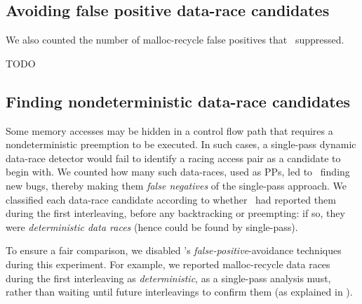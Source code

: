 %


\subsection{Avoiding false positive data-race candidates}
\label{sec:eval-falsepos}

We also counted the number of malloc-recycle false positives that \landslide~suppressed.

TODO


\subsection{Finding nondeterministic data-race candidates}
\label{sec:eval-falseneg}
Some memory accesses may be hidden in a control flow path that requires a nondeterministic preemption to be executed.
In such cases, a single-pass dynamic data-race detector
would fail
to identify a racing access pair as a candidate to begin with.
%
We counted how many such data-races, used as PPs, led to \quicksand~finding new bugs,
thereby making them {\em false negatives} of the single-pass approach.
We classified each data-race candidate according to whether \landslide~had reported them during the first interleaving, before any backtracking or preempting: if so, they were {\em deterministic data races} (hence could be found by single-pass).

To ensure a fair comparison, we disabled \landslide's {\em false-positive}-avoidance techniques during this experiment.
For example, we reported malloc-recycle data races during the first interleaving as {\em deterministic}, as a single-pass analysis must,
rather than waiting until future interleavings to confirm them (as explained in \sect{\ref{sec:recycle}}).

